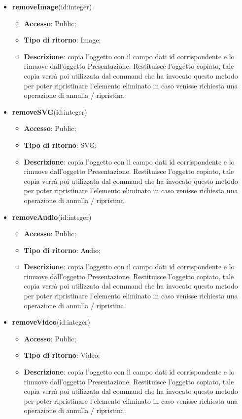 {\begin{itemize}
\begin{itemize}
			\end{itemize}
			\item \textbf{removeImage}(id:integer)
			\begin{itemize}
				\item \textbf{Accesso}: Public;
				\item \textbf{Tipo di ritorno}: Image;
				\item \textbf{Descrizione}: copia l’oggetto con il campo dati id corrispondente e lo rimuove dall’oggetto Presentazione. Restituisce l’oggetto copiato, tale copia verrà poi utilizzata dal command che ha invocato questo metodo per poter ripristinare l'elemento eliminato in caso venisse richiesta una operazione di annulla / ripristina.
			\end{itemize}
			\item \textbf{removeSVG}(id:integer)
			\begin{itemize}
				\item \textbf{Accesso}: Public;
				\item \textbf{Tipo di ritorno}: SVG;
				\item \textbf{Descrizione}: copia l’oggetto con il campo dati id corrispondente e lo rimuove dall’oggetto Presentazione. Restituisce l’oggetto copiato, tale copia verrà poi utilizzata dal command che ha invocato questo metodo per poter ripristinare l'elemento eliminato in caso venisse richiesta una operazione di annulla / ripristina.
			\end{itemize}
			\item \textbf{removeAudio}(id:integer)
			\begin{itemize}
				\item \textbf{Accesso}: Public;
				\item \textbf{Tipo di ritorno}: Audio;
				\item \textbf{Descrizione}: copia l’oggetto con il campo dati id corrispondente e lo rimuove dall’oggetto Presentazione. Restituisce l’oggetto copiato, tale copia verrà poi utilizzata dal command che ha invocato questo metodo per poter ripristinare l'elemento eliminato in caso venisse richiesta una operazione di annulla / ripristina.
			\end{itemize}
			\item \textbf{removeVideo}(id:integer)
			\begin{itemize}
				\item \textbf{Accesso}: Public;
				\item \textbf{Tipo di ritorno}: Video;
				\item \textbf{Descrizione}: copia l’oggetto con il campo dati id corrispondente e lo rimuove dall’oggetto Presentazione. Restituisce l’oggetto copiato, tale copia verrà poi utilizzata dal command che ha invocato questo metodo per poter ripristinare l'elemento eliminato in caso venisse richiesta una operazione di annulla / ripristina.

\end{itemize}
\end{itemize}}

